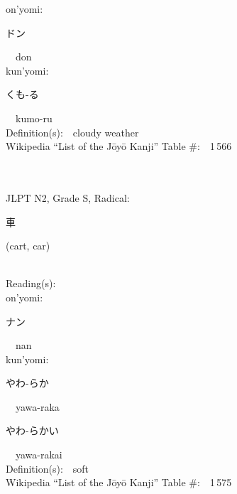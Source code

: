 \begin{multicols}{2}
{\hspace*{1em}}on'yomi:\ \ \\
{\hspace*{2em}}{\begin{CJK}{UTF8}{min} ドン \end{CJK}}\ \ don\ \ \\
{\hspace*{1em}}kun'yomi:\ \ \\
{\hspace*{2em}}{\begin{CJK}{UTF8}{min} くも-る \end{CJK}}\ \ kumo-ru\ \ \\
Definition(s):\ \ cloudy weather \\
Wikipedia ``List of the J\=oy\=o Kanji'' Table \#:\ \ 1\,566 \\
\ \ \\
{\fontsize{34pt}{40pt}  }\ \ \\  %
{JLPT N2, Grade S, Radical:\ \ {\begin{CJK}{UTF8}{min} 車 \end{CJK}} (cart, car) } \\
Reading(s):\ \ \\
{\hspace*{1em}}on'yomi:\ \ \\
{\hspace*{2em}}{\begin{CJK}{UTF8}{min} ナン \end{CJK}}\ \ nan\ \ \\
{\hspace*{1em}}kun'yomi:\ \ \\
{\hspace*{2em}}{\begin{CJK}{UTF8}{min} やわ-らか \end{CJK}}\ \ yawa-raka\ \ \\
{\hspace*{2em}}{\begin{CJK}{UTF8}{min} やわ-らかい \end{CJK}}\ \ yawa-rakai\ \ \\
Definition(s):\ \ soft \\
Wikipedia ``List of the J\=oy\=o Kanji'' Table \#:\ \ 1\,575 \\
\ \ \\
{\fontsize{34pt}{40pt}  }\ \ \\  %

\end{multicols}
